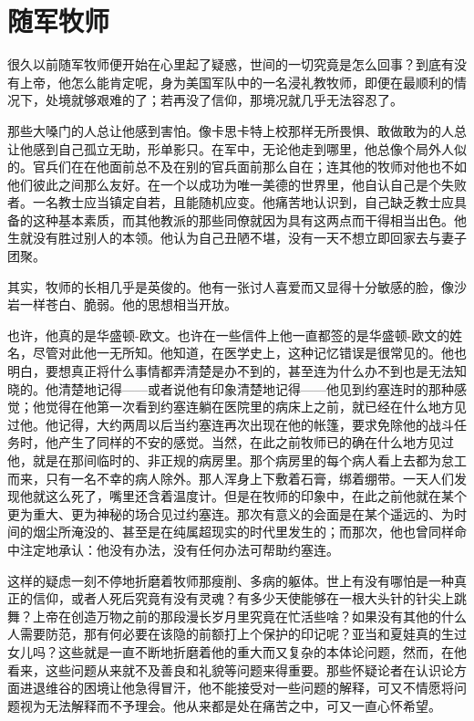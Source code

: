 \chapter{随军牧师}
 
    很久以前随军牧师便开始在心里起了疑惑，世间的一切究竟是怎么回事？到底有没有上帝，他怎么能肯定呢，身为美国军队中的一名浸礼教牧师，即便在最顺利的情况下，处境就够艰难的了；若再没了信仰，那境况就几乎无法容忍了。

    那些大嗓门的人总让他感到害怕。像卡思卡特上校那样无所畏惧、敢做敢为的人总让他感到自己孤立无助，形单影只。在军中，无论他走到哪里，他总像个局外人似的。官兵们在在他面前总不及在别的官兵面前那么自在；连其他的牧师对他也不如他们彼此之间那么友好。在一个以成功为唯一美德的世界里，他自认自己是个失败者。一名教士应当镇定自若，且能随机应变。他痛苦地认识到，自己缺乏教士应具备的这种基本素质，而其他教派的那些同僚就因为具有这两点而干得相当出色。他生就没有胜过别人的本领。他认为自己丑陋不堪，没有一天不想立即回家去与妻子团聚。

    其实，牧师的长相几乎是英俊的。他有一张讨人喜爱而又显得十分敏感的脸，像沙岩一样苍白、脆弱。他的思想相当开放。

    也许，他真的是华盛顿-欧文。也许在一些信件上他一直都签的是华盛顿-欧文的姓名，尽管对此他一无所知。他知道，在医学史上，这种记忆错误是很常见的。他也明白，要想真正将什么事情都弄清楚是办不到的，甚至连为什么办不到也是无法知晓的。他清楚地记得——或者说他有印象清楚地记得——他见到约塞连时的那种感觉；他觉得在他第一次看到约塞连躺在医院里的病床上之前，就已经在什么地方见过他。他记得，大约两周以后当约塞连再次出现在他的帐篷，要求免除他的战斗任务时，他产生了同样的不安的感觉。当然，在此之前牧师已的确在什么地方见过他，就是在那间临时的、非正规的病房里。那个病房里的每个病人看上去都为怠工而来，只有一名不幸的病人除外。那人浑身上下敷着石膏，绑着绷带。一天人们发现他就这么死了，嘴里还含着温度计。但是在牧师的印象中，在此之前他就在某个更为重大、更为神秘的场合见过约塞连。那次有意义的会面是在某个遥远的、为时间的烟尘所淹没的、甚至是在纯属超现实的时代里发生的；而那次，他也曾同样命中注定地承认：他没有办法，没有任何办法可帮助约塞连。

    这样的疑虑一刻不停地折磨着牧师那瘦削、多病的躯体。世上有没有哪怕是一种真正的信仰，或者人死后究竟有没有灵魂？有多少天使能够在一根大头针的针尖上跳舞？上帝在创造万物之前的那段漫长岁月里究竟在忙活些啥？如果没有其他的什么人需要防范，那有何必要在该隐的前额打上个保护的印记呢？亚当和夏娃真的生过女儿吗？这些就是一直不断地折磨着他的重大而又复杂的本体论问题，然而，在他看来，这些问题从来就不及善良和礼貌等问题来得重要。那些怀疑论者在认识论方面进退维谷的困境让他急得冒汗，他不能接受对一些问题的解释，可又不情愿将问题视为无法解释而不予理会。他从来都是处在痛苦之中，可又一直心怀希望。

